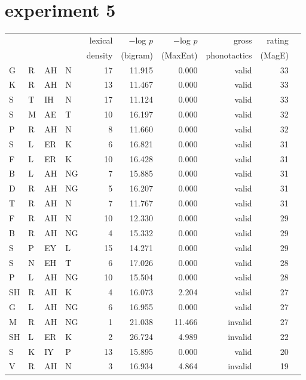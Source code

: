 \section{\citet{Scholes1966} experiment 5}    

\begin{longtable}{l@{ } l@{ } l@{ } l r r r r r r} 
\toprule
  &   &    &     & lexical & $-$log $p$ & $-$log $p$ & gross & rating \\
&&&& density & (bigram) & (MaxEnt) & phonotactics & (MagE) \\
\midrule 
G  & R  & AH & N  & 17 & 11.915 & 0.000  & valid   & 33 \\
K  & R  & AH & N  & 13 & 11.467 & 0.000  & valid   & 33 \\
S  & T  & IH & N  & 17 & 11.124 & 0.000  & valid   & 33 \\
S  & M  & AE & T  & 10 & 16.197 & 0.000  & valid   & 32 \\
P  & R  & AH & N  & 8  & 11.660 & 0.000  & valid   & 32 \\
S  & L  & ER & K  & 6  & 16.821 & 0.000  & valid   & 31 \\
F  & L  & ER & K  & 10 & 16.428 & 0.000  & valid   & 31 \\
B  & L  & AH & NG & 7  & 15.885 & 0.000  & valid   & 31 \\
D  & R  & AH & NG & 5  & 16.207 & 0.000  & valid   & 31 \\
T  & R  & AH & N  & 7  & 11.767 & 0.000  & valid   & 31 \\
F  & R  & AH & N  & 10 & 12.330 & 0.000  & valid   & 29 \\
B  & R  & AH & NG & 4  & 15.332 & 0.000  & valid   & 29 \\
S  & P  & EY & L  & 15 & 14.271 & 0.000  & valid   & 29 \\
S  & N  & EH & T  & 6  & 17.026 & 0.000  & valid   & 28 \\
P  & L  & AH & NG & 10 & 15.504 & 0.000  & valid   & 28 \\
SH & R  & AH & K  & 4  & 16.073 & 2.204  & valid   & 27 \\
G  & L  & AH & NG & 6  & 16.955 & 0.000  & valid   & 27 \\
M  & R  & AH & NG & 1  & 21.038 & 11.466 & invalid & 27 \\
SH & L  & ER & K  & 2  & 26.724 & 4.989  & invalid & 22 \\
S  & K  & IY & P  & 13 & 15.895 & 0.000  & valid   & 20 \\
V  & R  & AH & N  & 3  & 16.934 & 4.864  & invalid & 19 \\

\end{longtable}
